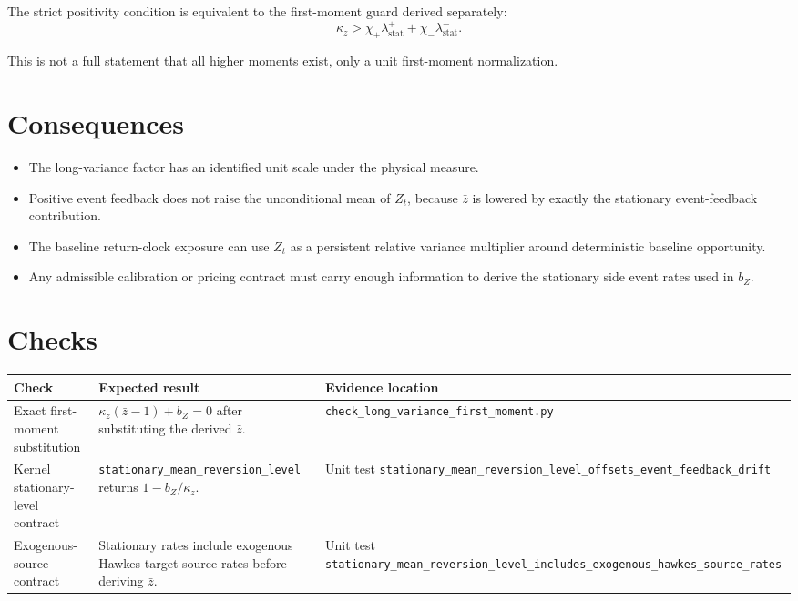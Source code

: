 \documentclass[11pt]{article}
\begin{document}
The strict positivity condition is equivalent to the first-moment guard derived
separately:
\[
    \kappa_z>
    \chi_+\lambda_{\mathrm{stat}}^+
    +\chi_-\lambda_{\mathrm{stat}}^-.
\]

This is not a full statement that all higher moments exist, only a unit first-moment normalization.

\section{Consequences}

\begin{itemize}
    \item The long-variance factor has an identified unit scale under the physical measure.
    \item Positive event feedback does not raise the unconditional mean of \(Z_t\), because \(\bar z\) is lowered by exactly the stationary event-feedback contribution.
    \item The baseline return-clock exposure can use \(Z_t\) as a persistent relative variance multiplier around deterministic baseline opportunity.
    \item Any admissible calibration or pricing contract must carry enough information to derive the stationary side event rates used in \(b_Z\).
\end{itemize}

\section{Checks}

\begin{tabularx}{\textwidth}{XXX}
\toprule
Check & Expected result & Evidence location\\
\midrule
Exact first-moment substitution
& \(\kappa_z(\bar z-1)+b_Z=0\) after substituting the derived \(\bar z\).
& \texttt{check\_long\_variance\_first\_moment.py}\\
Kernel stationary-level contract
& \texttt{stationary\_mean\_reversion\_level} returns \(1-b_Z/\kappa_z\).
& Unit test \texttt{stationary\_mean\_reversion\_level\_offsets\_event\_feedback\_drift}\\
Exogenous-source contract
& Stationary rates include exogenous Hawkes target source rates before deriving \(\bar z\).
& Unit test \texttt{stationary\_mean\_reversion\_level\_includes\_exogenous\_hawkes\_source\_rates}\\
\bottomrule
\end{tabularx}
\end{document}
